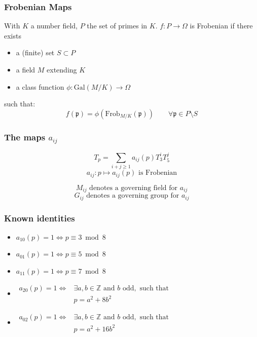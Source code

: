 \documentclass[12pt]{beamer}
\begin{document}
	\begin{frame}
		\frametitle{Frobenian Maps}
		With $K$ a number field, $P$ the set of primes in $K$.
		$f: P \to \Omega$ is Frobenian if there exists
		\begin{itemize}
			\item a (finite) set $S \subset P$
			\item a field $M$ extending $K$
			\item a class function $\phi: \text{Gal}(M/K) \to \Omega$
		\end{itemize}
		such that:
		$$f(\mathfrak{p}) = \phi( \text{Frob}_{M/K}(\mathfrak{p})) \qquad \forall \mathfrak{p} \in P \setminus S$$
	\end{frame}

	\begin{frame}
		\frametitle{The maps $a_{ij}$}
		$$T_p = \sum_{i+j \geq 1} a_{ij}(p) T_3^iT_5^j$$
		\vspace{1cm}
		$$a_{ij}: p \mapsto a_{ij}(p) \text{ is Frobenian}$$
		
		$$M_{ij} \text{ denotes a governing field for } a_{ij}$$
		$$G_{ij} \text{ denotes a governing group for } a_{ij}$$
	\end{frame}

	\begin{frame}
		\frametitle{Known identities}
		\begin{itemize}
			\item
			$a_{10}(p)=1 \iff p \equiv 3 \bmod 8$
			\item
			$a_{01}(p)=1 \iff p \equiv 5 \bmod 8$
			\item
			$a_{11}(p)=1 \iff p \equiv 7 \bmod 8$
			\item 
			$\begin{matrix}
				a_{20}(p)=1 \iff &\exists a,b \in \mathbb{Z} \text{ and } b \text{ odd},\text{ such that }\\
				&p=a^2+8b^2
			\end{matrix}$
			\item
			$\begin{matrix}
				a_{02}(p)=1 \iff &\exists a,b \in \mathbb{Z} \text{ and } b \text{ odd},\text{ such that }\\
				&p=a^2+16b^2
			\end{matrix}$
		\end{itemize}
	\end{frame}
\end{document}
